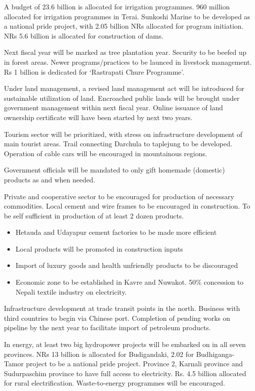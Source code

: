 \documentclass[
  openany]{book}
\providecommand{\tightlist}{%
  \setlength{\itemsep}{0pt}\setlength{\parskip}{0pt}}
\begin{document}
A budget of 23.6 billion is allocated for irrigation programmes. 960 million allocated for irrigation programmes in Terai. Sunkoshi Marine to be developed as a national pride project, with 2.05 billion NRs allocated for program initiation. NRs 5.6 billion is allocated for construction of dams.

Next fiscal year will be marked as tree plantation year. Security to be beefed up in forest areas. Newer programs/practices to be launced in livestock management. Rs 1 billion is dedicated for `Rastrapati Chure Programme'.

Under land management, a revised land management act will be introduced for sustainable utilization of land. Encroached public lands will be brought under government management within next fiscal year. Online issuance of land ownership certificate will have been started by next two years.

Tourism sector will be prioritized, with stress on infrastructure development of main tourist areas. Trail connecting Darchula to taplejung to be developed. Operation of cable cars will be encouraged in mountainous regions.

Government officials will be mandated to only gift homemade (domestic) products as and when needed.

Private and cooperative sector to be encouraged for production of necessary commodities. Local cement and wire frames to be encouraged in construction. To be self sufficient in production of at least 2 dozen products.

\begin{itemize}
\tightlist
\item
  Hetauda and Udayapur cement factories to be made more efficient
\item
  Local products will be promoted in construction inputs
\item
  Import of luxury goods and health unfriendly products to be discouraged
\item
  Economic zone to be established in Kavre and Nuwakot. 50\% concession to Nepali textile industry on electricity.
\end{itemize}

Infrastructure development at trade transit points in the north. Business with third countries to begin via Chinese port. Completion of pending works on pipeline by the next year to facilitate import of petroleum products.

In energy, at least two big hydropower projects will be embarked on in all seven provinces. NRs 13 billion is allocated for Budigandaki, 2.02 for Budhiganga-Tamor project to be a national pride project. Province 2, Karnali province and Sudurpaschim province to have full access to electricity. Rs. 4.5 billion allocated for rural electrification. Waste-to-energy programmes will be encouraged.
\end{document}

